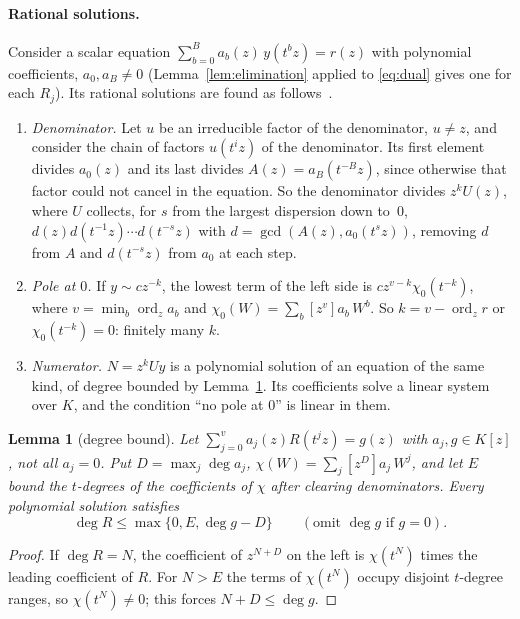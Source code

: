 \documentclass[11pt,a4paper]{article}
\theoremstyle{plain}
\newtheorem{lemma}[theorem]{Lemma}
\theoremstyle{definition}
\theoremstyle{remark}
\begin{document}
\paragraph{Rational solutions.} Consider a scalar equation
$\sum_{b=0}^Ba_b(z)\,y(t^bz)=r(z)$ with polynomial coefficients, $a_0,a_B\ne0$
(Lemma~\ref{lem:elimination} applied to \eqref{eq:dual} gives one for each
$R_j$). Its rational solutions are found as follows~\cite{Abramov}.
\begin{enumerate}
\item \emph{Denominator.} Let $u$ be an irreducible factor of the denominator,
  $u\ne z$, and consider the chain of factors $u(t^iz)$ of the denominator. Its
  first element divides $a_0(z)$ and its last divides $A(z)=a_B(t^{-B}z)$, since
  otherwise that factor could not cancel in the equation. So the denominator divides
  $z^kU(z)$, where $U$ collects, for $s$ from the largest dispersion down to~$0$,
  $d(z)d(t^{-1}z)\cdots d(t^{-s}z)$ with $d=\gcd(A(z),a_0(t^sz))$, removing $d$
  from $A$ and $d(t^{-s}z)$ from $a_0$ at each step.
\item \emph{Pole at $0$.} If $y\sim cz^{-k}$, the lowest term of the left side
  is $cz^{v-k}\chi_0(t^{-k})$, where $v=\min_b\operatorname{ord}_za_b$ and
  $\chi_0(W)=\sum_b[z^v]a_b\,W^b$. So $k=v-\operatorname{ord}_zr$ or
  $\chi_0(t^{-k})=0$: finitely many $k$.
\item \emph{Numerator.} $N=z^kUy$ is a polynomial solution of an equation of
  the same kind, of degree bounded by Lemma~\ref{lem:degree}. Its coefficients
  solve a linear system over $K$, and the condition ``no pole at $0$'' is linear
  in them.
\end{enumerate}

\begin{lemma}[degree bound]\label{lem:degree}
Let $\sum_{j=0}^va_j(z)R(t^jz)=g(z)$ with $a_j,g\in K[z]$, not all $a_j=0$. Put
$D=\max_j\deg a_j$, $\chi(W)=\sum_j[z^D]a_j\,W^j$, and let $E$ bound the
$t$-degrees of the coefficients of $\chi$ after clearing denominators. Every
polynomial solution satisfies
\[
  \deg R\le\max\{0,E,\deg g-D\}\qquad(\text{omit }\deg g\text{ if }g=0).
\]
\end{lemma}
\begin{proof}
If $\deg R=N$, the coefficient of $z^{N+D}$ on the left is $\chi(t^N)$ times the
leading coefficient of $R$. For $N>E$ the terms of $\chi(t^N)$ occupy disjoint
$t$-degree ranges, so $\chi(t^N)\ne0$; this forces $N+D\le\deg g$.
\end{proof}
\end{document}
